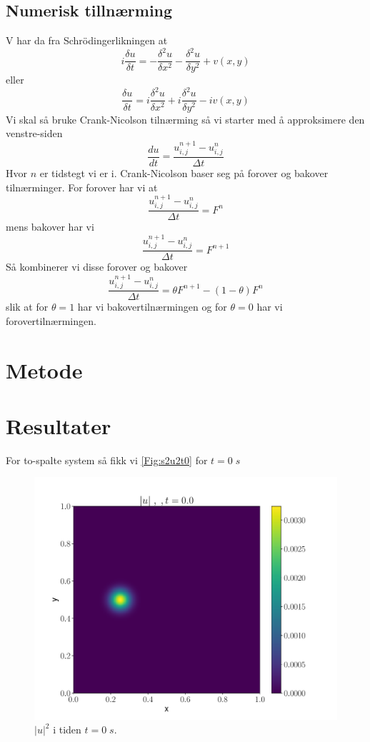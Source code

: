 \documentclass[reprint,english,notitlepage]{revtex4-2}  %
\begin{document}
\subsection{Numerisk tillnærming} 
V har da fra Schrödingerlikningen at
$$
i\frac{\delta u}{\delta t}=-\frac{\delta^2 u}{\delta x^2}-\frac{\delta^2 u}{\delta y^2}+v(x,y)
$$
eller 
$$
\frac{\delta u}{\delta t}=i\frac{\delta^2 u}{\delta x^2}+i\frac{\delta^2 u}{\delta y^2}-iv(x,y)
$$
Vi skal så bruke Crank-Nicolson tilnærming så vi starter med å approksimere den venstre-siden
$$
\frac{d u}{dt}=\frac{u^{n+1}_{i,j}-u^{n}_{i,j}}{\Delta t}
$$
Hvor $n$ er tidstegt vi er i.
Crank-Nicolson baser seg på forover og bakover tilnærminger. For forover har vi at
$$
\frac{u^{n+1}_{i,j}-u^{n}_{i,j}}{\Delta t}=F^{n}
$$ 
mens bakover har vi
$$
\frac{u^{n+1}_{i,j}-u^{n}_{i,j}}{\Delta t}=F^{n+1}
$$
Så kombinerer vi disse forover og bakover
$$
\frac{u^{n+1}_{i,j}-u^n_{i,j}}{\Delta t}=\theta F^{n+1}-(1-\theta)F^{n}
$$
slik at for $\theta=1$ har vi bakovertilnærmingen og for $\theta=0$ har vi forovertilnærmingen.
\section{Metode}
\section{Resultater}

For to-spalte system så fikk vi \autoref{Fig:s2u2t0} for $t = 0 \; s$

\begin{figure}[H]
\centering
\includegraphics[scale=0.45, trim={3cm 0 0 0}]{../Images/ImshowUt00.pdf}
\caption{$|u|^2 $ i tiden $t = 0 \; s$.}
\label{Fig:s2u2t0}
\end{figure}
\end{document}
